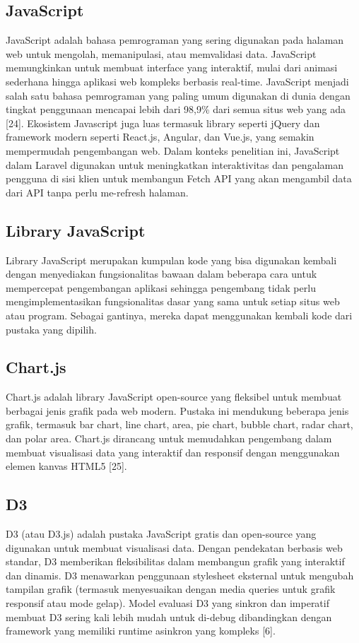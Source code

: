 \subsection{JavaScript}
JavaScript adalah bahasa pemrograman yang sering digunakan pada halaman web untuk mengolah, memanipulasi, atau memvalidasi data. JavaScript memungkinkan untuk membuat interface yang interaktif, mulai dari animasi sederhana hingga aplikasi web kompleks berbasis real-time. JavaScript menjadi salah satu bahasa pemrograman yang paling umum digunakan di dunia dengan tingkat penggunaan mencapai lebih dari 98,9\% dari semua situs web yang ada [24]. Ekosistem Javascript juga luas termasuk library seperti jQuery dan framework modern seperti React.js, Angular, dan Vue.js, yang semakin mempermudah pengembangan web. Dalam konteks penelitian ini, JavaScript dalam Laravel digunakan untuk meningkatkan interaktivitas dan pengalaman pengguna di sisi klien untuk membangun Fetch API yang akan mengambil data dari API tanpa perlu me-refresh halaman.

\subsection{Library JavaScript}
Library JavaScript merupakan kumpulan kode yang bisa digunakan kembali dengan menyediakan fungsionalitas bawaan dalam beberapa cara untuk mempercepat pengembangan aplikasi sehingga pengembang tidak perlu mengimplementasikan fungsionalitas dasar yang sama untuk setiap situs web atau program. Sebagai gantinya, mereka dapat menggunakan kembali kode dari pustaka yang dipilih.

\subsection{Chart.js}
Chart.js adalah library JavaScript open-source yang fleksibel untuk membuat berbagai jenis grafik pada web modern. Pustaka ini mendukung beberapa jenis grafik, termasuk bar chart, line chart, area, pie chart, bubble chart, radar chart, dan polar area. Chart.js dirancang untuk memudahkan pengembang dalam membuat visualisasi data yang interaktif dan responsif dengan menggunakan elemen kanvas HTML5 [25].

\subsection{D3}
D3 (atau D3.js) adalah pustaka JavaScript gratis dan open-source yang digunakan untuk membuat visualisasi data. Dengan pendekatan berbasis web standar, D3 memberikan fleksibilitas dalam membangun grafik yang interaktif dan dinamis.  D3 menawarkan penggunaan stylesheet eksternal untuk mengubah tampilan grafik (termasuk menyesuaikan dengan media queries untuk grafik responsif atau mode gelap). Model evaluasi D3 yang sinkron dan imperatif membuat D3 sering kali lebih mudah untuk di-debug dibandingkan dengan framework yang memiliki runtime asinkron yang kompleks [6].

